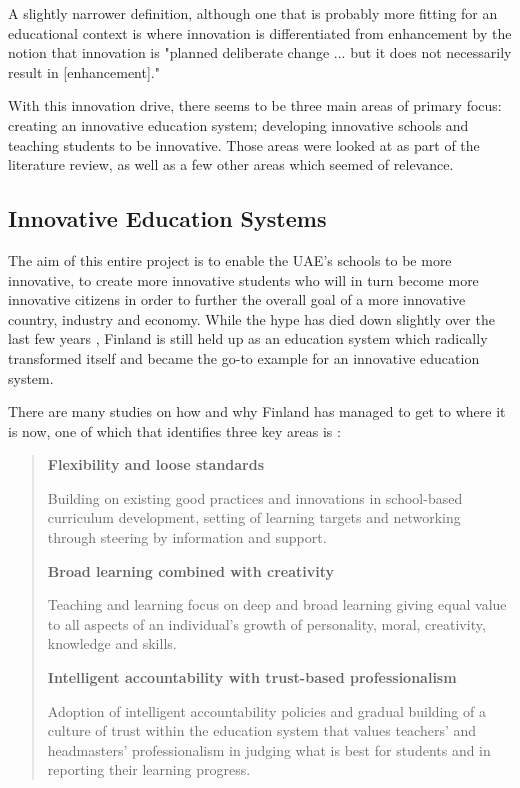 A slightly narrower definition, although one that is probably more fitting for an educational context is where innovation is differentiated from enhancement by the notion that innovation is "planned deliberate change ... but it does not necessarily result in [enhancement]." \cite{hannan2002innovative}

With this innovation drive, there seems to be three main areas of primary focus: creating an innovative education system; developing innovative schools and teaching students to be innovative. Those areas were looked at as part of the literature review, as well as a few other areas which seemed of relevance.

\subsection{Innovative Education Systems}
The aim of this entire project is to enable the UAE's schools to be more innovative, to create more innovative students who will in turn become more innovative citizens in order to further the overall goal of a more innovative country, industry and economy. While the hype has died down slightly over the last few years \cite{1_sahlgren_2013, 2_clark_2016, 3_anderson_2016}, Finland is still held up as an education system which radically transformed itself and became the go-to example for an innovative education system.

There are many studies on how and why Finland has managed to get to where it is now, one of which that identifies three key areas is \citet{Sahlberg2007}:

\begin{quote}
\textbf{Flexibility and loose standards}

Building on existing good practices and innovations in school-based curriculum development, setting of learning targets and networking through steering by information and support.


\textbf{Broad learning combined with creativity}

Teaching and learning focus on deep and broad learning giving equal value to all aspects of an individual’s growth of personality, moral, creativity, knowledge and skills.


\textbf{Intelligent accountability with trust-based professionalism}

Adoption of intelligent accountability policies and gradual building of a culture of trust within the education system that values teachers’ and headmasters’ professionalism in judging what is best for students and in reporting their learning progress.
\end{quote}


